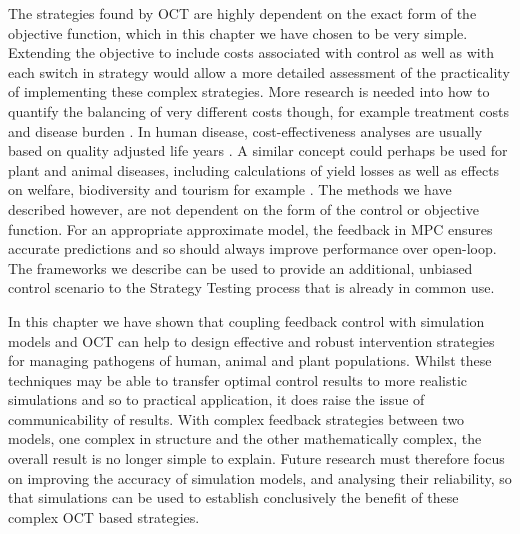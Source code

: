 The strategies found by OCT are highly dependent on the exact form of the objective function, which in this chapter we have chosen to be very simple. Extending the objective to include costs associated with control as well as with each switch in strategy would allow a more detailed assessment of the practicality of implementing these complex strategies. More research is needed into how to quantify the balancing of very different costs though, for example treatment costs and disease burden \citep{rowthorn_optimal_2009}. In human disease, cost-effectiveness analyses are usually based on quality adjusted life years \citep{whitehead_health_2010}. A similar concept could perhaps be used for plant and animal diseases, including calculations of yield losses \cite{savary_crop_2012} as well as effects on welfare, biodiversity and tourism for example \citep{boyd_consequence_2013}. The methods we have described however, are not dependent on the form of the control or objective function. For an appropriate approximate model, the feedback in MPC ensures accurate predictions and so should always improve performance over open-loop. The frameworks we describe can be used to provide an additional, unbiased control scenario to the Strategy Testing process that is already in common use.

In this chapter we have shown that coupling feedback control with simulation models and OCT can help to design effective and robust intervention strategies for managing pathogens of human, animal and plant populations. Whilst these techniques may be able to transfer optimal control results to more realistic simulations and so to practical application, it does raise the issue of communicability of results. With complex feedback strategies between two models, one complex in structure and the other mathematically complex, the overall result is no longer simple to explain. Future research must therefore focus on improving the accuracy of simulation models, and analysing their reliability, so that simulations can be used to establish conclusively the benefit of these complex OCT based strategies.
